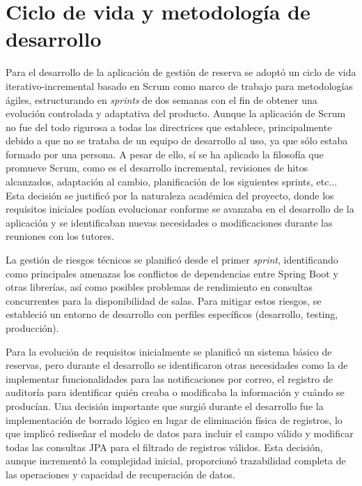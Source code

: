 
\section{Ciclo de vida y metodología de desarrollo}\label{ciclo-de-vida-metodologia-desarrollo}
Para el desarrollo de la aplicación de gestión de reserva se adoptó un ciclo de vida iterativo-incremental basado en Scrum como marco de trabajo para metodologías ágiles, estructurando en \emph{sprints} de dos semanas con el fin de obtener una evolución controlada y adaptativa del producto. Aunque la aplicación de Scrum no fue del todo rigurosa a todas las directrices que establece, principalmente debido a que no se trataba de un equipo de desarrollo al uso, ya que sólo estaba formado por una persona. A pesar de ello, sí se ha aplicado la filosofía que promueve Scrum, como es el desarrollo incremental, revisiones de hitos alcanzados, adaptación al cambio, planificación de los siguientes sprints, etc... Esta decisión se justificó por la naturaleza académica del proyecto, donde los requisitos iniciales podían evolucionar conforme se avanzaba en el desarrollo de la aplicación y se identificaban nuevas necesidades o modificaciones durante las reuniones con los tutores.

La gestión de riesgos técnicos se planificó desde el primer \emph{sprint}, identificando como principales amenazas los conflictos de dependencias entre Spring Boot y otras librerías, así como posibles problemas de rendimiento en consultas concurrentes para la disponibilidad de salas. Para mitigar estos riesgos, se estableció un entorno de desarrollo con perfiles específicos (desarrollo, testing, producción).

Para la evolución de requisitos inicialmente se planificó un sistema básico de reservas, pero durante el desarrollo se identificaron otras necesidades como la de implementar funcionalidades para las notificaciones por correo, el registro de auditoría para identificar quién creaba o modificaba la información y cuándo se producían. 
Una decisión importante que surgió durante el desarrollo fue la implementación de borrado lógico en lugar de eliminación física de registros, lo que implicó rediseñar el modelo de datos para incluir el campo válido y modificar todas las consultas JPA para el filtrado de registros válidos. Esta decisión, aunque incrementó la complejidad inicial, proporcionó trazabilidad completa de las operaciones y capacidad de recuperación de datos.


